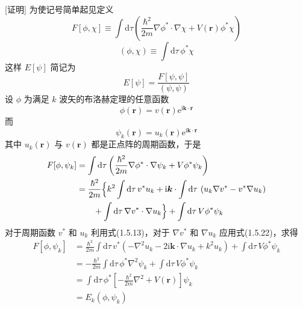 [证明] 为使记号简单起见定义
\begin{equation}
  F[\phi,\chi]\equiv\int\mathrm{d}\tau\left(
  \frac{\hbar^{2}}{2m}\nabla\phi^{*}\cdot\nabla\chi
  +V(\boldsymbol{r})\phi^{*}\chi\right)
\end{equation}
\begin{equation}
  (\phi,\chi)\equiv\int\mathrm{d}\tau\,\phi^{*}\chi
\end{equation}
这样 $E[\psi]$ 简记为
\begin{equation}
  E[\psi]=\frac{F[\psi,\psi]}{(\psi,\psi)}
\end{equation}
设 $\phi$ 为满足 $k$ 波矢的布洛赫定理的任意函数
\begin{equation}
  \phi(\boldsymbol{r})=v(\boldsymbol{r})
  \mathrm{e}^{\mathrm{i}\boldsymbol{k}\cdot\boldsymbol{r}}
\end{equation}
而
\begin{equation}
  \psi_{k}(\boldsymbol{r})=u_{k}(\boldsymbol{r})
  \mathrm{e}^{\mathrm{i}\boldsymbol{k}\cdot\boldsymbol{r}}
\end{equation}
其中 $u_{k}(\boldsymbol{r})$ 与 $v(\boldsymbol{r})$ 都是正点阵的周期函数，于是
\begin{equation*}
\begin{aligned}
  F[\phi,\psi_{k}]
  &=\int\mathrm{d}\tau\left(\frac{\hbar^{2}}{2m}
  \nabla\phi^{*}\cdot\nabla\psi_{k}
  +V\phi^{*}\psi_{k}\right)\\
  &=\frac{\hbar^{2}}{2m}\Bigl\{k^{2}\int\mathrm{d}\tau\,
  v^{*}u_{k}
  +\mathrm{i}\boldsymbol{k}\cdot\int\mathrm{d}\tau\,
  \left(u_{k}\nabla v^{*}-v^{*}\nabla u_{k}\right)\\
  &\qquad+\int\mathrm{d}\tau\,\nabla v^{*}\cdot\nabla u_{k}
  \Bigr\}+\int\mathrm{d}\tau\,V\phi^{*}\psi_{k}
\end{aligned}
\end{equation*}
对于周期函数 $v^{*}$ 和 $u_{k}$ 利用式(1.5.13)，对于 $\nabla v^{*}$ 和 $\nabla u_{k}$ 应用式(1.5.22)，求得
\begin{equation}
\begin{aligned}
  F[\phi,\psi_{k}]
  &=\frac{\hbar^{2}}{2m}\int\mathrm{d}\tau\,v^{*}
  \left(-\nabla^{2}u_{k}
  -2\mathrm{i}\boldsymbol{k}\cdot\nabla u_{k}
  +k^{2}u_{k}\right)
  +\int\mathrm{d}\tau\,V\phi^{*}\psi_{k}\\
  &=-\frac{\hbar^{2}}{2m}\int\mathrm{d}\tau\,\phi^{*}
  \nabla^{2}\psi_{k}
  +\int\mathrm{d}\tau\,V\phi^{*}\psi_{k}\\
  &=\int\mathrm{d}\tau\,\phi^{*}\left[-\frac{\hbar^{2}}{2m}
  \nabla^{2}+V(\boldsymbol{r})\right]\psi_{k}\\
  &=E_{k}\left(\phi,\psi_{k}\right)
\end{aligned}
\end{equation}
